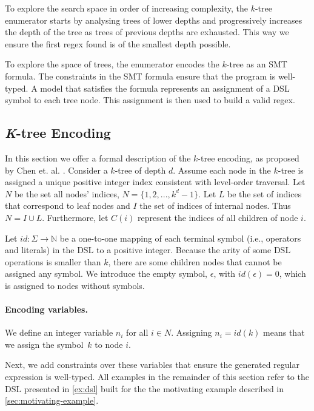 To explore the search space in order of increasing complexity, the \(k\)-tree enumerator starts by analysing trees of lower depths and progressively increases the depth of the tree as trees of previous depths are exhausted.
This way we ensure the first regex found is of the smallest depth possible.





To explore the space of trees, the enumerator encodes the \(k\)-tree as an \ac{SMT} formula. 
%
The constraints in the \ac{SMT} formula ensure that the program is well-typed. 
%
A model that satisfies the formula represents an assignment of a DSL symbol to each tree node. This assignment is then used to build a valid regex.

\subsection{\textit{K}-tree Encoding}

In this section we offer a formal description of the \(k\)-tree encoding, as proposed by Chen et. al. \cite{DBLP:conf/sigsoft/ChenMF19,Orvalho19}.
Consider a \(k\)-tree of depth \(d\). Assume each node in the \(k\)-tree is assigned a unique positive integer index consistent with level-order traversal. Let \(N\) be the set all nodes' indices, \(N = \{1, 2, ..., k^d - 1\}\).
%
Let \(L\) be the set of indices that correspond to leaf nodes and \(I\) the set of indices of internal nodes. Thus \(N = I \cup L\). Furthermore, let \(C(i)\) represent the indices of all children of node \(i\).

Let \(id: \Sigma \to \mathbb{N}\) be a one-to-one mapping of each terminal symbol (i.e., operators and literals) in the DSL to a positive integer.
Because the arity of some DSL operations is smaller than \(k\), there are some children nodes that cannot be assigned any symbol. We introduce the empty symbol, \(\epsilon\), with \(id(\epsilon) = 0\), which is assigned to nodes without symbols.

\paragraph{Encoding variables.}
We define an integer variable \(n_i\) for all \(i \in N\). Assigning \(n_i = id(k)\) means
that we assign the symbol~\(k\) to node \(i\).

\medskip

Next, we add constraints over these variables that ensure the generated regular expression is well-typed. 
All examples in the remainder of this section refer to the DSL presented in \autoref{ex:dsl} built for the
the motivating example described in \autoref{sec:motivating-example}.

